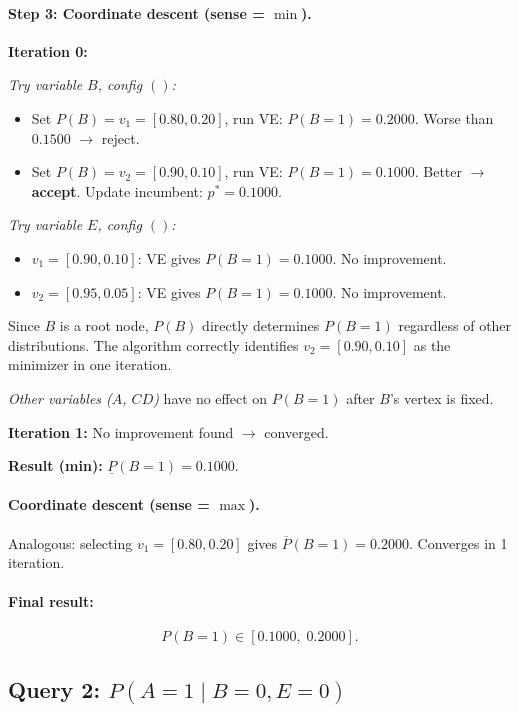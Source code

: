 \documentclass[11pt]{article}
\begin{document}
\paragraph{Step 3: Coordinate descent (sense = $\min$).}

\textbf{Iteration 0:}

\emph{Try variable $B$, config $()$:}
\begin{itemize}
  \item Set $P(B) = v_1 = [0.80, 0.20]$, run VE: $P(B{=}1) = 0.2000$.
        Worse than $0.1500$ $\to$ reject.
  \item Set $P(B) = v_2 = [0.90, 0.10]$, run VE: $P(B{=}1) = 0.1000$.
        Better $\to$ \textbf{accept}. Update incumbent: $p^* = 0.1000$.
\end{itemize}

\emph{Try variable $E$, config $()$:}
\begin{itemize}
  \item $v_1 = [0.90, 0.10]$: VE gives $P(B{=}1) = 0.1000$. No improvement.
  \item $v_2 = [0.95, 0.05]$: VE gives $P(B{=}1) = 0.1000$. No improvement.
\end{itemize}

Since $B$ is a root node, $P(B)$ directly determines $P(B{=}1)$ regardless of
other distributions. The algorithm correctly identifies $v_2 = [0.90, 0.10]$ as the
minimizer in one iteration.

\emph{Other variables ($A$, $CD$)} have no effect on $P(B{=}1)$ after $B$'s vertex is fixed.

\textbf{Iteration 1:} No improvement found $\to$ converged.

\textbf{Result (min):} $\underline{P}(B{=}1) = 0.1000$.

\paragraph{Coordinate descent (sense = $\max$).}
Analogous: selecting $v_1 = [0.80, 0.20]$ gives $\overline{P}(B{=}1) = 0.2000$.
Converges in 1 iteration.

\paragraph{Final result:}
\[
  \boxed{P(B{=}1) \in [0.1000,\; 0.2000].}
\]

\subsection{Query 2: $P(A{=}1 \mid B{=}0, E{=}0)$}
\end{document}
